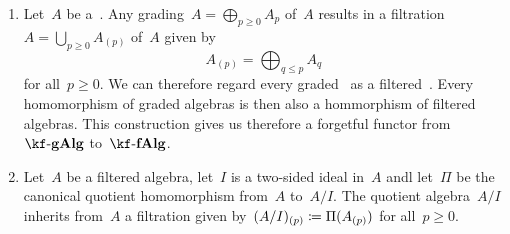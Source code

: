 \begin{remark}
  \leavevmode
  \begin{enumerate}
    \item
      Let~$A$ be a~\algebra{$\kf$}.
      Any grading~$A = \bigoplus_{p \geq 0} A_p$ of~$A$ results in a filtration~$A = \bigcup_{p \geq 0} A_{(p)}$ of~$A$ given by
      \[
        A_{(p)}
        =
        \bigoplus_{q \leq p} A_q
      \]
      for all~$p \geq 0$.
      We can therefore regard every graded~{\algebra{$\kf$}} as a filtered~{\algebra{$\kf$}}.
      Every homomorphism of graded algebras is then also a hommorphism of filtered algebras.
      This construction gives us therefore a forgetful functor from~$\cgAlg{\kf}$ to~$\cfAlg{\kf}$.
    \item 
      Let~$A$ be a filtered algebra, let~$I$ is a two-sided ideal in~$A$ andl let~$\Pi$ be the canonical quotient homomorphism from~$A$ to~$A/I$.
      The quotient algebra~$A/I$ inherits from~$A$ a filtration given by~$(A/I)_{(p)} \coloneqq \Pi(A_{(p)})$ for all~$p \geq 0$.
  \end{enumerate}
\end{remark}


